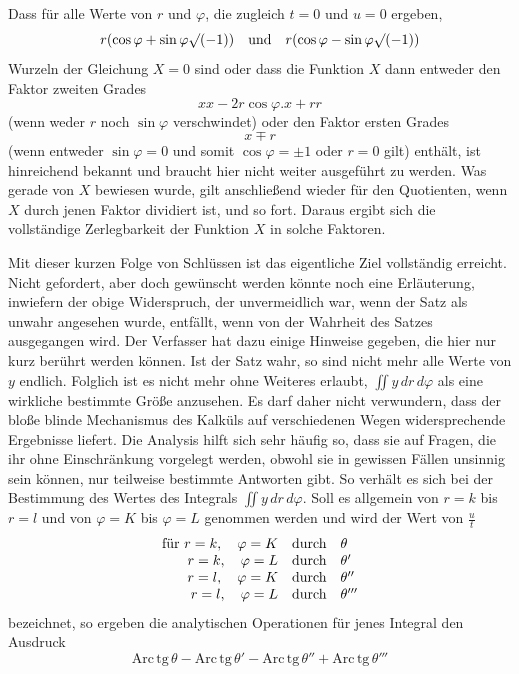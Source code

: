 Dass für alle Werte von $r$ und $\varphi$, die zugleich $t=0$ und $u=0$ ergeben,
\[
r(\cos\varphi+\sin\varphi\surd(-1))\quad\hbox{und}\quad
r(\cos\varphi-\sin\varphi\surd(-1))
\]
Wurzeln der Gleichung $X=0$ sind oder dass die Funktion $X$ dann entweder den Faktor zweiten Grades
\[
xx-2r\cos\varphi.x+rr
\]
(wenn weder $r$ noch $\sin\varphi$ verschwindet) oder den Faktor ersten Grades
\[
x\mp r
\]
(wenn entweder $\sin\varphi=0$ und somit $\cos\varphi=\pm1$ oder $r=0$ gilt) enthält, ist hinreichend bekannt und braucht hier nicht weiter ausgeführt zu werden. Was gerade von $X$ bewiesen wurde, gilt anschließend wieder für den Quotienten, wenn $X$ durch jenen Faktor dividiert ist, und so fort. Daraus ergibt sich die vollständige Zerlegbarkeit der Funktion $X$ in solche Faktoren.

Mit dieser kurzen Folge von Schlüssen ist das eigentliche Ziel vollständig erreicht. Nicht gefordert, aber doch gewünscht werden könnte noch eine Erläuterung, inwiefern der obige Widerspruch, der unvermeidlich war, wenn der Satz als unwahr angesehen wurde, entfällt, wenn von der Wahrheit des Satzes ausgegangen wird. Der Verfasser hat dazu einige Hinweise gegeben, die hier nur kurz berührt werden können. Ist der Satz wahr, so sind nicht mehr alle Werte von $y$ endlich. Folglich ist es nicht mehr ohne Weiteres erlaubt, $\iint y\,dr\,d\varphi$ als eine wirkliche bestimmte Größe anzusehen. Es darf daher nicht verwundern, dass der bloße blinde Mechanismus des Kalküls auf verschiedenen Wegen widersprechende Ergebnisse liefert. Die Analysis hilft sich sehr häufig so, dass sie auf Fragen, die ihr ohne Einschränkung vorgelegt werden, obwohl sie in gewissen Fällen unsinnig sein können, nur teilweise bestimmte Antworten gibt. So verhält es sich bei der Bestimmung des Wertes des Integrals $\iint y\,dr\,d\varphi$. Soll es allgemein von $r=k$ bis $r=l$ und von $\varphi=K$ bis $\varphi=L$ genommen werden und wird der Wert von $\frac{u}{t}$
\[
\begin{array}{rcl}
\hbox{für }r=k,\quad\varphi=K&\hbox{durch}&\theta\\
r=k,\quad\varphi=L&\hbox{durch}&\theta'\\
r=l,\quad\varphi=K&\hbox{durch}&\theta''\\
r=l,\quad\varphi=L&\hbox{durch}&\theta'''
\end{array}
\]
bezeichnet, so ergeben die analytischen Operationen für jenes Integral den Ausdruck
\[
\mathrm{Arc\,tg}\,\theta-\mathrm{Arc\,tg}\,\theta'
-\mathrm{Arc\,tg}\,\theta''+\mathrm{Arc\,tg}\,\theta'''
\]

